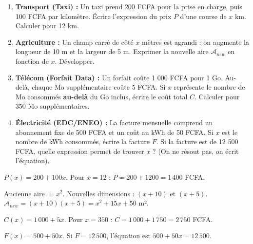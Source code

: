 \documentclass[11pt]{article}
\begin{document}
\begin{exercice}
\begin{enumerate}
 \item \textbf{Transport (Taxi) :} Un taxi prend 200 FCFA pour la prise en charge, puis 100 FCFA par kilomètre. Écrire l'expression du prix $P$ d'une course de $x$ km. Calculer pour 12 km.
 \item \textbf{Agriculture :} Un champ carré de côté $x$ mètres est agrandi : on augmente la longueur de 10 m et la largeur de 5 m. Exprimer la nouvelle aire $\mathcal{A}_{new}$ en fonction de $x$. Développer.
 \item \textbf{Télécom (Forfait Data) :} Un forfait coûte 1 000 FCFA pour 1 Go. Au-delà, chaque Mo supplémentaire coûte 5 FCFA. Si $x$ représente le nombre de Mo consommés \textbf{au-delà} du Go inclus, écrire le coût total $C$. Calculer pour 350 Mo supplémentaires.
 \item \textbf{Électricité (EDC/ENEO) :} La facture mensuelle comprend un abonnement fixe de 500 FCFA et un coût au kWh de 50 FCFA. Si $x$ est le nombre de kWh consommés, écrire la facture $F$. Si la facture est de 12 500 FCFA, quelle expression permet de trouver $x$ ? (On ne résout pas, on écrit l'équation).
\end{enumerate}
\end{exercice}

\begin{corrige}
$P(x) = 200 + 100x$. Pour $x=12$ : $P = 200 + 1200 = 1\,400$ FCFA.
\end{corrige}
\begin{corrige}
Ancienne aire $= x^2$. Nouvelles dimensions : $(x+10)$ et $(x+5)$.
$\mathcal{A}_{new} = (x+10)(x+5) = x^2 + 15x + 50$ m².
\end{corrige}
\begin{corrige}
$C(x) = 1\,000 + 5x$. Pour $x=350$ : $C = 1\,000 + 1\,750 = 2\,750$ FCFA.
\end{corrige}
\begin{corrige}
$F(x) = 500 + 50x$. Si $F = 12\,500$, l'équation est $500 + 50x = 12\,500$.
\end{corrige}
\end{document}
